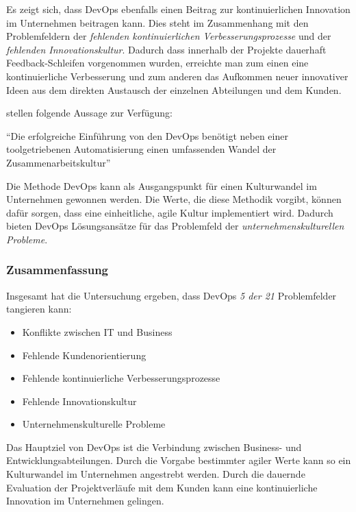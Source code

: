 Es zeigt sich, dass DevOps ebenfalls einen Beitrag zur kontinuierlichen Innovation im Unternehmen beitragen kann. Dies steht im Zusammenhang mit den Problemfeldern der \textit{fehlenden kontinuierlichen Verbesserungsprozesse} und der \textit{fehlenden Innovationskultur}. Dadurch dass innerhalb der Projekte dauerhaft Feedback-Schleifen vorgenommen wurden, erreichte man zum einen eine kontinuierliche Verbesserung und zum anderen das Aufkommen neuer innovativer Ideen aus dem direkten Austausch der einzelnen Abteilungen und dem Kunden.

 stellen folgende Aussage zur Verfügung:

\begin{center}
	``Die erfolgreiche Einführung von den DevOps benötigt neben einer toolgetriebenen Automatisierung einen umfassenden Wandel der Zusammenarbeitskultur'' \cite[S. 53]{alt_innovationsorientiertes_2017}
\end{center}

Die Methode DevOps kann als Ausgangspunkt für einen Kulturwandel im Unternehmen gewonnen werden. Die Werte, die diese Methodik vorgibt, können dafür sorgen, dass eine einheitliche, agile Kultur implementiert wird. Dadurch bieten DevOps Lösungsansätze für das Problemfeld der \textit{unternehmenskulturellen Probleme}.

\subsubsection{Zusammenfassung}

Insgesamt hat die Untersuchung ergeben, dass DevOps \textit{5 der 21} Problemfelder tangieren kann:

\begin{itemize}[noitemsep, topsep=0pt]
	\item Konflikte zwischen IT und Business
	\item Fehlende Kundenorientierung
	\item Fehlende kontinuierliche Verbesserungsprozesse
	\item Fehlende Innovationskultur
	\item Unternehmenskulturelle Probleme
\end{itemize}

Das Hauptziel von DevOps ist die Verbindung zwischen Business- und Entwicklungsabteilungen. Durch die Vorgabe bestimmter agiler Werte kann so ein Kulturwandel im Unternehmen angestrebt werden. Durch die dauernde Evaluation der Projektverläufe mit dem Kunden kann eine kontinuierliche Innovation im Unternehmen gelingen.

